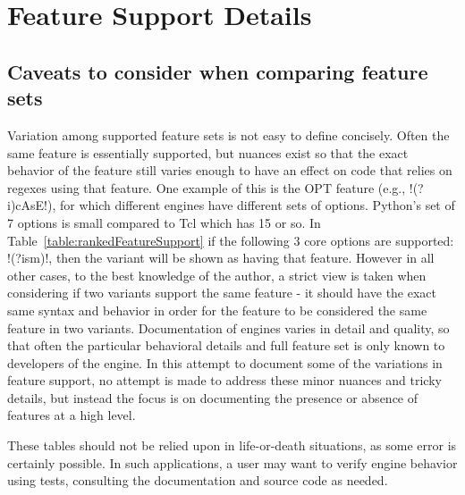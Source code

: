 \section*{Feature Support Details}

\subsection*{Caveats to consider when comparing feature sets}
\label{app:caveats}
Variation among supported feature sets is not easy to define concisely.  Often the same feature is essentially supported, but nuances exist so that the exact behavior of the feature still varies enough to have an effect on code that relies on regexes using that feature.  One example of this is the OPT feature (e.g., \cverb!(?i)cAsE!), for which different engines have different sets of options.  Python's set of 7 options is small compared to Tcl which has 15 or so.  In Table~\ref{table:rankedFeatureSupport} if the following 3 core options are supported: \cverb!(?ism)!, then the variant will be shown as having that feature.  However in all other cases, to the best knowledge of the author, a strict view is taken when considering if two variants support the same feature - it should have the exact same syntax and behavior in order for the feature to be considered the same feature in two variants.  Documentation of engines varies in detail and quality, so that often the particular behavioral details and full feature set is only known to developers of the engine.  In this attempt to document some of the variations in feature support, no attempt is made to address these minor nuances and tricky details, but instead the focus is on documenting the presence or absence of features at a high level.

These tables should not be relied upon in life-or-death situations, as some error is certainly possible.  In such applications, a user may want to verify engine behavior using tests, consulting the documentation and source code as needed.


